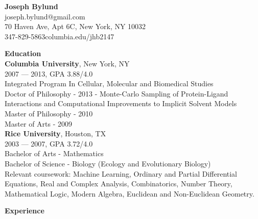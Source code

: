 
\begin{center}
\myfontsize{\bigheader}
\textbf{Joseph Bylund}\\
\myfontsize{\bodysize}
joseph.bylund@gmail.com\\
70 Haven Ave, Apt 6C, New York, NY 10032\\
347-829-5863\hspace{3ex}columbia.edu/{\mytilde}jhb2147\\
\end{center}

\myfontsize{\bigheader}
\textbf{Education}\\
\myfontsize{\bodysize}
\textbf{Columbia University}, New York, NY\\
2007 --- 2013, GPA 3.88/4.0\\
Integrated Program In Cellular, Molecular and Biomedical Studies\\
Doctor of Philosophy - 2013 - Monte-Carlo Sampling of Protein-Ligand Interactions and Computational Improvements to Implicit Solvent Models\\
Master of Philosophy - 2010\\
Master of Arts - 2009\\
\vspace{\littleskip}
\textbf{Rice University}, Houston, TX\\
2003 --- 2007, GPA 3.72/4.0\\
Bachelor of Arts - Mathematics\\
Bachelor of Science - Biology (Ecology and Evolutionary Biology)\\
Relevant coursework: Machine Learning, Ordinary and Partial Differential Equations, Real and Complex Analysis, Combinatorics, Number Theory, Mathematical Logic, Modern Algebra, Euclidean and Non-Euclidean Geometry.

\vspace{\mybigskip}
\myfontsize{\bigheader}
\textbf{Experience}
\myfontsize{\bodysize}

